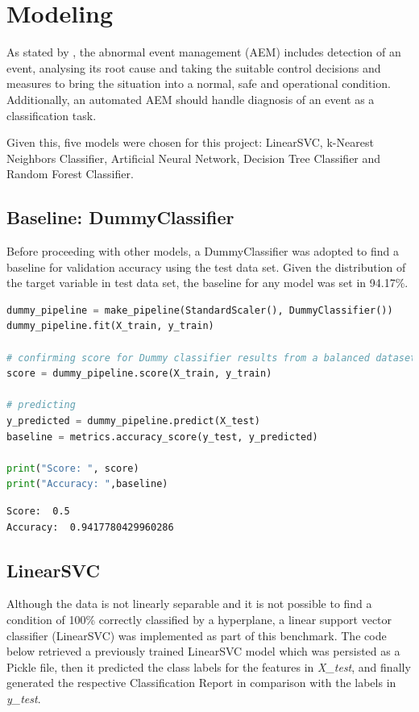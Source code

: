 \documentclass{article}
\begin{document}
\section{Modeling}

As stated by \textcite{venkatasubramanian_rengaswamy_yin_kavuri_2003}, the abnormal event management (AEM) includes detection of an event, analysing its root cause and taking the suitable control decisions and measures to bring the situation into a normal, safe and operational condition. Additionally, an automated AEM should handle diagnosis of an event as a classification task.

Given this, five models were chosen for this project: LinearSVC, k-Nearest Neighbors Classifier, Artificial Neural Network, Decision Tree Classifier and Random Forest Classifier. 

\subsection{Baseline: DummyClassifier}
Before proceeding with other models, a DummyClassifier was adopted to find a baseline for validation accuracy using the test data set. Given the distribution of the target variable in test data set, the baseline for any model was set in 94.17\%.

\begin{lstlisting}[language=Python]
dummy_pipeline = make_pipeline(StandardScaler(), DummyClassifier())
dummy_pipeline.fit(X_train, y_train)

# confirming score for Dummy classifier results from a balanced dataset
score = dummy_pipeline.score(X_train, y_train)

# predicting
y_predicted = dummy_pipeline.predict(X_test)
baseline = metrics.accuracy_score(y_test, y_predicted)

print("Score: ", score)
print("Accuracy: ",baseline)
\end{lstlisting}
\begin{verbatim}
Score:  0.5
Accuracy:  0.9417780429960286
\end{verbatim}

\subsection{LinearSVC}
Although the data is not linearly separable and it is not possible to find a condition of 100\% correctly classified by a hyperplane, a linear support vector classifier (LinearSVC) was implemented as part of this benchmark. The code below retrieved a previously trained LinearSVC model which was persisted as a Pickle file, then it predicted the class labels for the features in \emph{X\_test}, and finally generated the respective Classification Report in comparison with the labels in \emph{y\_test}.
\end{document}
